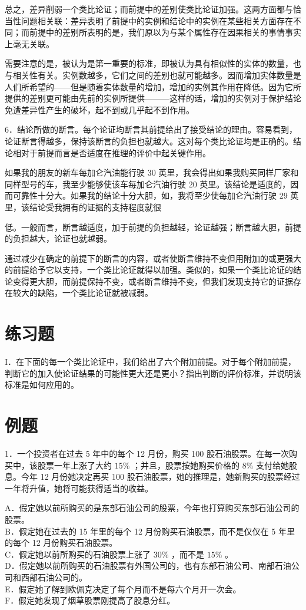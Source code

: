 总之，差异削弱一个类比论证；而前提中的差别使类比论证加强。这两方面都与恰当性问题相关联：差异表明了前提中的实例和结论中的实例在某些相关方面存在不同；而前提中的差别所表明的是，我们原以为与某个属性存在因果相关的事情事实上毫无关联。

需要注意的是，被认为是第一重要的标准，即被认为具有相似性的实体的数量，也与相关性有关。实例数越多，它们之间的差别也就可能越多。因而增加实体数量是人们所希望的——但是随着实体数量的增加，增加的实例其作用在降低。因为它所提供的差别更可能由先前的实例所提供———这样的话，增加的实例对于保护结论免遭差异性产生的破坏，起不到或几乎起不到作用。

6．结论所做的断言。每个论证均断言其前提给出了接受结论的理由。容易看到，论证断言得越多，保持该断言的负担也就越大。这对每个类比论证均是正确的。结论相对于前提而言是否适度在推理的评价中起关键作用。

如果我的朋友的新车每加仑汽油能行驶 30 英里，我会得出如果我购买同样厂家和同样型号的车，我至少能够使该车每加仑汽油行驶 20 英里。该结论是适度的，因而可靠性十分大。如果我的结论十分大胆，如，我将至少使每加仑汽油行驶 29 英里，该结论受我拥有的证据的支持程度就很

低。一般而言，断言越适度，加于前提的负担越轻，论证越强；断言越大胆，前提的负担越大，论证也就越弱。

通过减少在确定的前提下的断言的内容，或者使断言维持不变但用附加的或更强大的前提给予它以支持，一个类比论证就得以加强。类似的，如果一个类比论证的结论变得更大胆，而前提保持不变，或者断言维持不变，但我们发现支持它的证据存在较大的缺陷，一个类比论证就被减弱。

\section*{练习题}
I．在下面的每一个类比论证中，我们给出了六个附加前提。对于每个附加前提，判断它的加入使论证结果的可能性更大还是更小？指出判断的评价标准，并说明该标准是如何应用的。

\section*{例题}
1．一个投资者在过去 5 年中的每个 12 月份，购买 100 股石油股票。在每一次购买中，该股票一年上涨了大约 $15 \%$ ；并且，股票按她购买价格的 $8 \%$ 支付给她股息。今年 12 月份她决定再买 100 股石油股票，她的推理是，她新购买的股票经过一年将升值，她将可能获得适当的收益。

A．假定她以前所购买的是东部石油公司的股票，今年也打算购买东部石油公司的股票。\\
B．假定她在过去的 15 年里的每个 12 月份购买石油股票，而不是仅仅在 5 年里的每个 12 月份购买石油股票。\\
C．假定她以前所购买的石油股票上涨了 $30 \%$ ，而不是 $15 \%$ 。\\
D．假定她以前所购买的石油股票有外国公司的，也有东部石油公司、南部石油公司和西部石油公司的。\\
E．假定她了解到欧佩克决定了每个月而不是每六个月开一次会。\\
F．假定她发现了烟草股票刚提高了股息分红。

